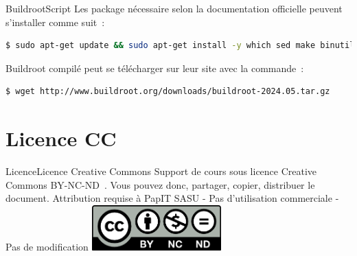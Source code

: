 \documentclass{beamer}
\begin{document}
    \begin{frame}[fragile]{Buildroot}{Script}
        Les package nécessaire selon la documentation officielle peuvent s'installer comme suit~:
        \begin{lstlisting}[language=bash]
$ sudo apt-get update && sudo apt-get install -y which sed make binutils build-essential diffutils gcc g++ bash patch gzip bzip2 perl tar cpio unzip rsync file bc findutils wget python3 libncurses5-dev qt5-qmake libglib2.0-dev libgtk2.0-dev libglade2-dev bzr cvs git mercurial openssh-client subversion openjdk-11-jdk asciidoc w3m dblatex graphviz python3-matplotlib python3-aiohttp
        \end{lstlisting}
        Buildroot compilé peut se télécharger sur leur site avec la commande~:
        \begin{lstlisting}[language=bash]
$ wget http://www.buildroot.org/downloads/buildroot-2024.05.tar.gz
        \end{lstlisting}
    \end{frame}


    \section{Licence CC}\label{sec:licence}

    \begin{frame}{Licence}{Licence Creative Commons}
        Support de cours sous licence Creative Commons BY-NC-ND~.
        \bigbreak
        Vous pouvez donc, partager, copier, distribuer le document.
        \bigbreak
        Attribution requise à PapIT SASU - Pas d’utilisation commerciale - Pas de modification
        \bigbreak
        \centering
        \includegraphics[width=5cm]{image/by-nc-nd-logo}
    \end{frame}
\end{document}
